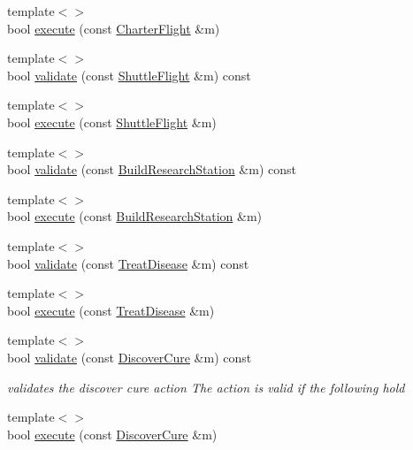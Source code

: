 \begin{DoxyCompactItemize}
\item 
{\footnotesize template$<$$>$ }\\bool \hyperlink{classpan_1_1_action_handler_a2f471e252e4cff4e06e9f95309f2049a}{execute} (const \hyperlink{classpan_1_1_charter_flight}{Charter\+Flight} \&m)
\item 
{\footnotesize template$<$$>$ }\\bool \hyperlink{classpan_1_1_action_handler_a3b8964b9b1888df96c71da3447967656}{validate} (const \hyperlink{classpan_1_1_shuttle_flight}{Shuttle\+Flight} \&m) const
\item 
{\footnotesize template$<$$>$ }\\bool \hyperlink{classpan_1_1_action_handler_ae5962fc9522e37b575fe9922cb28e040}{execute} (const \hyperlink{classpan_1_1_shuttle_flight}{Shuttle\+Flight} \&m)
\item 
{\footnotesize template$<$$>$ }\\bool \hyperlink{classpan_1_1_action_handler_ad55077a791011a4af860f67793d0e3e5}{validate} (const \hyperlink{classpan_1_1_build_research_station}{Build\+Research\+Station} \&m) const
\item 
{\footnotesize template$<$$>$ }\\bool \hyperlink{classpan_1_1_action_handler_a82301269ae5559636bdd1e41373757d6}{execute} (const \hyperlink{classpan_1_1_build_research_station}{Build\+Research\+Station} \&m)
\item 
{\footnotesize template$<$$>$ }\\bool \hyperlink{classpan_1_1_action_handler_a9d0117592a8ef88cbb945e82b0676f58}{validate} (const \hyperlink{classpan_1_1_treat_disease}{Treat\+Disease} \&m) const
\item 
{\footnotesize template$<$$>$ }\\bool \hyperlink{classpan_1_1_action_handler_adcbd9a954dcbaa6b968facd6395797a6}{execute} (const \hyperlink{classpan_1_1_treat_disease}{Treat\+Disease} \&m)
\item 
{\footnotesize template$<$$>$ }\\bool \hyperlink{classpan_1_1_action_handler_a148408970391d77cc793b5e33fe55789}{validate} (const \hyperlink{classpan_1_1_discover_cure}{Discover\+Cure} \&m) const
\begin{DoxyCompactList}\small\item\em validates the discover cure action The action is valid if the following hold \end{DoxyCompactList}\item 
{\footnotesize template$<$$>$ }\\bool \hyperlink{classpan_1_1_action_handler_aa39cbd76ffdebb15c21890730a79606d}{execute} (const \hyperlink{classpan_1_1_discover_cure}{Discover\+Cure} \&m)

\end{DoxyCompactItemize}
